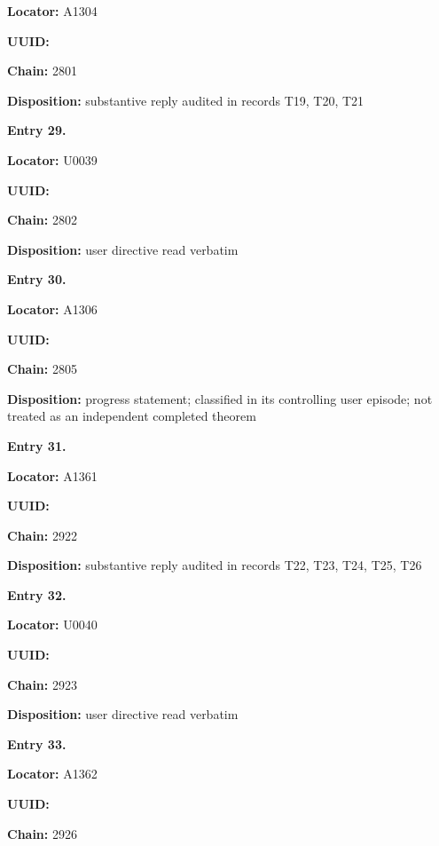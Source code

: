 \textbf{Locator:} A1304

\textbf{UUID:} \protect{}

\textbf{Chain:} 2801

\textbf{Disposition:} substantive reply audited in records T19, T20, T21


\textbf{Entry 29.}

\textbf{Locator:} U0039

\textbf{UUID:} \protect{}

\textbf{Chain:} 2802

\textbf{Disposition:} user directive read verbatim


\textbf{Entry 30.}

\textbf{Locator:} A1306

\textbf{UUID:} \protect{}

\textbf{Chain:} 2805

\textbf{Disposition:} progress statement; classified in its controlling
user episode; not treated as an independent completed theorem


\textbf{Entry 31.}

\textbf{Locator:} A1361

\textbf{UUID:} \protect{}

\textbf{Chain:} 2922

\textbf{Disposition:} substantive reply audited in records T22, T23,
T24, T25, T26


\textbf{Entry 32.}

\textbf{Locator:} U0040

\textbf{UUID:} \protect{}

\textbf{Chain:} 2923

\textbf{Disposition:} user directive read verbatim


\textbf{Entry 33.}

\textbf{Locator:} A1362

\textbf{UUID:} \protect{}

\textbf{Chain:} 2926

